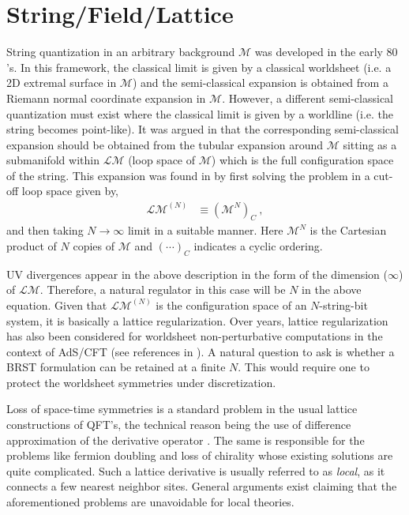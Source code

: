 \documentclass[
article,12pt]{article}
\begin{document}
\section{String/Field/Lattice} 

String quantization in an arbitrary background $ \mathcal{M} $ was developed in the early $80$'s. In this framework, the
classical limit is given by a classical worldsheet (i.e. a 2D extremal surface in $ \mathcal{M} $) and the semi-classical
expansion is obtained from a Riemann normal coordinate expansion in $\mathcal{M}$. However, a different semi-classical
quantization must exist where the classical limit is given by a worldline (i.e. the string becomes point-like). It was
argued in \cite{semi-classical} that the corresponding semi-classical expansion should be obtained from the tubular
expansion around $\mathcal{M}$ sitting as a submanifold within $\mathcal{L}\mathcal{M}$ (loop space of $\mathcal{M}$) which is the full configuration
space of the string. This expansion was found in \cite{cut-off} by first solving the problem in a cut-off loop space
given by,
\begin{align}
  \mathcal{L} \mathcal{M}^{(N)} & \equiv (\mathcal{M}^N)_C ~,
\end{align}
and then taking $N\to \infty$ limit in a suitable manner. Here $\mathcal{M}^N$ is the Cartesian product of $N$ copies of $\mathcal{M}$ and $(\cdots)_C$ indicates a cyclic ordering.

UV divergences appear in the above description in the form of the dimension ($\infty$) of $\mathcal{L}\mathcal{M}$. Therefore, a natural regulator in this case will be $N$ in the above equation. Given that $\mathcal{L}\mathcal{M}^{(N)}$ is the configuration space of an $N$-string-bit system, it is basically a lattice regularization. Over years, lattice regularization has also been considered for worldsheet non-perturbative computations in the context of AdS/CFT (see references in \cite{covlatt1}). A natural question to ask is whether a BRST formulation can be retained at a finite $N$. This would require one to protect the worldsheet symmetries under discretization. 

Loss of space-time symmetries is a standard problem in the usual lattice constructions of QFT's, the technical reason being the use of difference approximation of the derivative operator \cite{wilson}. The same is responsible for the problems like fermion doubling and loss of chirality whose existing solutions are quite complicated. Such a lattice derivative is usually referred to as {\it local}, as it connects a few nearest neighbor sites. General arguments exist \cite{NNtheorem} claiming that the aforementioned problems are unavoidable for local theories. 
\end{document}
